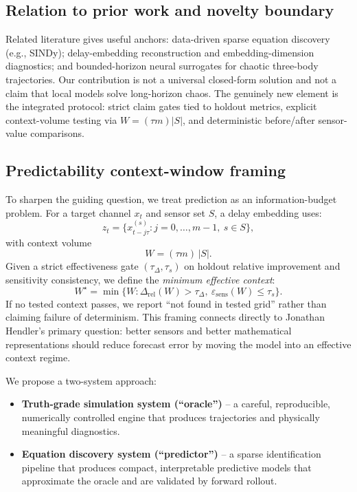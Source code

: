 \documentclass[11pt]{article}
\begin{document}
\subsection*{Relation to prior work and novelty boundary}
Related literature gives useful anchors: data-driven sparse equation discovery (e.g., SINDy)\cite{Brunton2016}; delay-embedding reconstruction and embedding-dimension diagnostics\cite{Takens1981,Kennel1992,KennelAbarbanel2002}; and bounded-horizon neural surrogates for chaotic three-body trajectories\cite{Breen2020}. Our contribution is not a universal closed-form solution and not a claim that local models solve long-horizon chaos. The genuinely new element is the integrated protocol: strict claim gates tied to holdout metrics, explicit context-volume testing via $W=(\tau m)|S|$, and deterministic before/after sensor-value comparisons.

\subsection*{Predictability context-window framing}
To sharpen the guiding question, we treat prediction as an information-budget problem. For a target channel $x_t$ and sensor set $S$, a delay embedding uses:
\[
z_t=\{x_{t-j\tau}^{(s)}: j=0,\ldots,m-1,\ s\in S\},
\]
with context volume
\[
W=(\tau m)\,|S|.
\]
Given a strict effectiveness gate $(\tau_\Delta,\tau_s)$ on holdout relative improvement and sensitivity consistency, we define the \emph{minimum effective context}:
\[
W^\star=\min\{W:\Delta_{\mathrm{rel}}(W)>\tau_\Delta,\ \varepsilon_{\mathrm{sens}}(W)\le\tau_s\}.
\]
If no tested context passes, we report ``not found in tested grid'' rather than claiming failure of determinism.
This framing connects directly to Jonathan Hendler's primary question: better sensors and better mathematical representations should reduce forecast error by moving the model into an effective context regime.

We propose a two-system approach:
\begin{itemize}
\item \textbf{Truth-grade simulation system (``oracle'')} -- a careful, reproducible, numerically controlled engine that produces trajectories and physically meaningful diagnostics.
\item \textbf{Equation discovery system (``predictor'')} -- a sparse identification pipeline that produces compact, interpretable predictive models that approximate the oracle and are validated by forward rollout.
\end{itemize}
\end{document}
